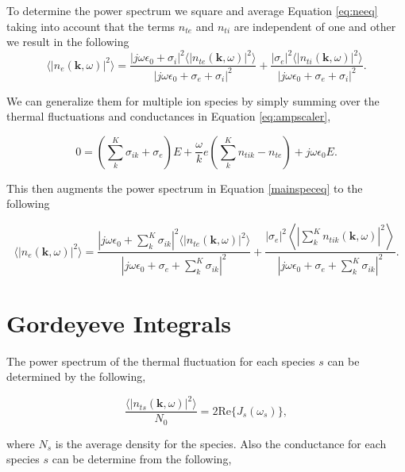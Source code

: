\documentclass[10pt]{report}
\begin{document}
\noindent To determine the power spectrum we square and average Equation \ref{eq:neeq} taking into account that the terms $n_{te}$ and $n_{ti}$ are independent of one and other we result in the following
\begin{equation}
\label{mainspeceq}
\langle \left|n_e(\mathbf{k},\omega)\right|^2\rangle = \frac{|j\omega\epsilon_0 + \sigma_i|^2 \langle |n_{te}(\mathbf{k},\omega)|^2\rangle}{|j\omega\epsilon_0 +\sigma_e+\sigma_i|^2} + \frac{| \sigma_e|^2 \langle |n_{ti}(\mathbf{k},\omega)|^2\rangle}{|j\omega\epsilon_0 +\sigma_e+\sigma_i|^2}.
\end{equation}

We can generalize them for multiple ion species by simply summing over the thermal fluctuations and conductances in Equation \ref{eq:ampscaler},

\begin{equation} 
\label{eq:ampscalersum}
0=\left(\displaystyle \sum_k^K\sigma_{ik} +\sigma_e\right)E +\frac{\omega}{k}e\left(\sum_k^Kn_{tik}-n_{te}\right) +j\omega \epsilon_0 E.
\end{equation}

\noindent This then augments the power spectrum in Equation \ref{mainspeceq} to the following

\begin{equation}
\label{eq:sumspeceq}
\displaystyle \langle \left|n_e(\mathbf{k},\omega)\right|^2\rangle = \frac{\left|j\omega\epsilon_0 +  \sum_k^K\sigma_{ik} \right|^2 \langle |n_{te}(\mathbf{k},\omega)|^2\rangle}{\left|j\omega\epsilon_0 +\sigma_e+ \sum_k^K\sigma_{ik} \right|^2} + \frac{| \sigma_e|^2 \left \langle \left|\sum_k^Kn_{tik}(\mathbf{k},\omega)\right|^2\right\rangle}{\left|j\omega\epsilon_0 +\sigma_e+ \sum_k^K\sigma_{ik} \right|^2}.
\end{equation}

\section*{Gordeyeve Integrals}
The power spectrum of the thermal fluctuation for each species $s$ can be determined by the following,

\begin{equation}
\label{eq:thermalfl}
\frac{\langle|n_{ts}(\mathbf{k},\omega)|^2\rangle}{N_0} = 2\text{Re}\{J_s(\omega_s)\},
\end{equation}

\noindent where $N_s$ is the average density for the species.  Also the conductance for each species $s$ can be determine from the following,
\end{document}
